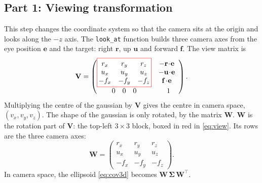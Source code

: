 \documentclass[9pt,twocolumn,a4paper]{extarticle}
\newcommand{\code}[1]{\texttt{#1}}
\newcommand{\Sig}{\symbf{\Sigma}}
\begin{document}
\subsection{Part 1: Viewing transformation}
\label{sec:cam}
This step changes the coordinate system so that the camera sits at the origin and looks along the $-z$ axis. The \code{look\_at} function builds three camera axes from the eye position $\mathbf{e}$ and the target: right $\mathbf{r}$, up $\mathbf{u}$ and forward $\mathbf{f}$. The view matrix is
\begin{equation}
\mathbf{V}=\begin{pmatrix}
\setlength{\fboxsep}{2pt}\fcolorbox{red}{white}{$\begin{matrix}
r_x&r_y&r_z\\u_x&u_y&u_z\\-f_x&-f_y&-f_z\end{matrix}$}
&\begin{matrix}-\mathbf{r}\!\cdot\!\mathbf{e}\\-\mathbf{u}\!\cdot\!\mathbf{e}\\ \mathbf{f}\!\cdot\!\mathbf{e}\end{matrix}\\[3mm]
\begin{matrix}0&0&0\end{matrix}&1\end{pmatrix}.
\label{eq:view}
\end{equation}
Multiplying the centre of the gaussian by $\mathbf{V}$ gives the centre in camera space, $(v_x,v_y,v_z)$. The shape of the gaussian is only rotated, by the matrix $\mathbf{W}$. $\mathbf{W}$ is the rotation part of $\mathbf{V}$: the top-left $3\times3$ block, boxed in red in \eqref{eq:view}. Its rows are the three camera axes:
\begin{equation}
\mathbf{W}=\begin{pmatrix}
r_x&r_y&r_z\\u_x&u_y&u_z\\-f_x&-f_y&-f_z\end{pmatrix}.
\label{eq:W}
\end{equation}
In camera space, the ellipsoid \eqref{eq:cov3d} becomes $\mathbf{W}\,\Sig\,\mathbf{W}^{\top}$.

\par\noindent{}\par\vspace{3pt}
\end{document}
